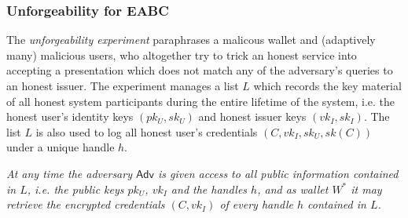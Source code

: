 \documentclass[runningheads]{llncs}
\renewcommand{\adv}{\mathsf{Adv}}
\begin{document}
\subsubsection{Unforgeability for EABC}
\label{s:EABCunforgeability}
 
The \emph{unforgeability experiment}  paraphrases a malicous wallet and (adaptively many) malicious users,
who altogether try to trick an honest service into accepting a presentation which does not match any of the adversary's queries to an honest issuer.
The experiment manages a  list $L$ which records the key material of all honest system participants during the entire lifetime of the system, i.e. the honest user's identity keys $(pk_U,sk_U)$ and honest issuer keys $(vk_I,sk_I)$.
The list $L$ is also used to log all honest user's credentials $(C, vk_I, sk_U, sk(C))$ under a unique handle $h$.

\emph{
At any time the adversary $\adv$ is given access to all public information contained in $L$, i.e. the public keys $pk_U$, $vk_I$ and the  handles $h$, and as wallet $W^*$ it may retrieve the encrypted credentials $(C, vk_I)$ of every handle $h$ contained in $L$.
}
\end{document}
